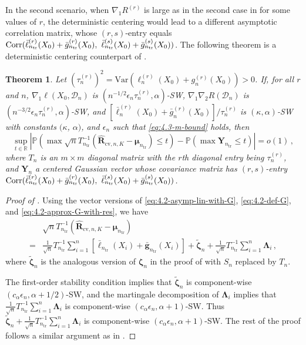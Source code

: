 \documentclass[11pt]{article}
\theoremstyle{plain}
\newtheorem{theorem}{Theorem}[section]
\newcommand{\cv}{{\mathrm{cv}}}
\newcommand{\tr}{{\mathrm{tr}}}
\newcommand{\D}{{\mathcal{D}}}
\newcommand{\var}{\mathrm{Var}}
\begin{document}
In the second scenario, when $\nabla_1 R^{(r)}$ is large as in the second case in  for some values of $r$, the deterministic centering would lead to a different asymptotic correlation matrix, whose $(r,s)$-entry equals ${\rm Corr}(\bar\ell_{n_\tr}^{(r)}(X_0)+\bar g_{n_\tr}^{(r)}(X_0),~\bar\ell_{n_\tr}^{(s)}(X_0)+\bar g_{n_\tr}^{(s)}(X_0))$. The following theorem is a deterministic centering counterpart of .
\begin{theorem}
    \label{thm:4.3-hd-cv-clt-det-2}
     Let $(\tau_n^{(r)})^2=\var(\ell_n^{(r)}(X_0)+g_n^{(r)}(X_0))>0$.
        If, for all $r$ and $n$, $\nabla_1\ell(X_0,\D_n)$ is $(n^{-1/2}\epsilon_n\tau_n^{(r)},\alpha)$-SW,
        $\nabla_1\nabla_2 R(\D_n)$ is $(n^{-3/2}\epsilon_n\tau_n^{(r)},\alpha)$-SW, and $[\bar\ell_n^{(r)}(X_0)+\bar g_n^{(r)}(X_0)]/\tau_n^{(r)}$ is $(\kappa,\alpha)$-SW with constants $(\kappa$, $\alpha)$, and $\epsilon_n$ such that \eqref{eq:4.3-m-bound} holds, then 
$$\sup_{t\in\mathbb R}\left|\mathbb P\left(\max \sqrt{n}T_{n_\tr}^{-1}(\hat{\mathbf R}_{\cv,n,K}-\boldsymbol{\mu}_{n_\tr})\le t\right) - \mathbb P(\max\mathbf Y_{n_\tr}\le t) \right|=o(1)\,,$$
where $T_n$ is an $m\times m$ diagonal matrix with the $r$th diagonal entry being $\tau_n^{(r)}$, and $\mathbf Y_n$ a centered Gaussian vector whose covariance matrix has $(r,s)$-entry ${\rm Corr}(\bar\ell_{n_\tr}^{(r)}(X_0)+\bar g_{n_\tr}^{(r)}(X_0),~\bar\ell_{n_\tr}^{(s)}(X_0)+\bar g_{n_\tr}^{(s)}(X_0))$.
\end{theorem}
\begin{proof}
    [Proof of ]
    Using the vector versions of \eqref{eq:4.2-asymp-lin-with-G}, \eqref{eq:4.2-def-G}, and \eqref{eq:4.2-approx-G-with-res}, we have
\begin{align*}
   & \sqrt{n}T_{n_\tr}^{-1}(\hat{\mathbf R}_{\cv,n,K}-\boldsymbol{\mu}_{n_\tr})\\
   =&\frac{1}{\sqrt{n}}T_{n_\tr}^{-1}\sum_{i=1}^n \left[\bar{\boldsymbol{\ell}}_{n_\tr}(X_i)+\bar{\boldsymbol{g}}_{n_\tr}(X_i)\right] +\boldsymbol{\tilde\zeta}_n+
   \frac{1}{\sqrt{n}}T_{n_\tr}^{-1}\sum_{i=1}^n \boldsymbol{\Lambda}_i\,,
\end{align*}
where $\tilde{\boldsymbol{\zeta}}_n$ is the analogous version of $\boldsymbol{\zeta}_n$ in the proof of  with $S_n$ replaced by $T_n$.

The first-order stability condition implies that $\tilde{\boldsymbol{\zeta}}_n$ is component-wise $(c_\alpha \epsilon_n,\alpha+1/2)$-SW, and the martingale decomposition of $\boldsymbol{\Lambda}_i$ implies that $\frac{1}{\sqrt{n}}T_{n_\tr}^{-1}\sum_{i=1}^n \boldsymbol{\Lambda}_i$ is component-wise $(c_\alpha\epsilon_n,\alpha+1)$-SW.  Thus
$\boldsymbol{\tilde\zeta}_n+
   \frac{1}{\sqrt{n}}T_{n_\tr}^{-1}\sum_{i=1}^n \boldsymbol{\Lambda}_i$ is component-wise $(c_\alpha\epsilon_n,\alpha+1)$-SW. The rest of the proof follows a similar argument as in .
\end{proof}
\end{document}
